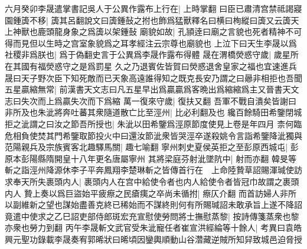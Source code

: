 六月癸卯李晟遣掌書記吳人于公異作露布上行在|{
	上時掌翻}
曰臣已肅清宫禁祗謁寢園鍾簴不移|{
	簴其呂翻說文曰簴鍾鼔之拊也飾爲猛獸釋名曰横曰栒縱曰簴又云簴天上神獸也鹿頭龍身象之爲簴以架鍾鼔}
廟貌如故|{
	孔頴逹曰廟之言貌也死者精神不可得而見但以生時之宫室象貌爲之耳孝經注云宗尊也廟貌也}
上泣下曰天生李晟以爲社稷非爲朕也|{
	爲于偽翻史言于公異爲李晟作露布得體}
晟在渭橋熒惑守歲|{
	歲星所在其國有福熒惑守之是爲罰星}
久之乃退賓佐皆賀曰熒惑退舍皇家之福也宜速進兵晟曰天子野次臣下知死敵而已天象高遠誰得知之既克長安乃謂之曰曏非相拒也吾聞五星贏縮無常|{
	前漢書天文志曰凡五星早出爲贏贏爲客晩出爲縮縮爲主又晉書天文志曰失次而上爲贏失次而下爲縮}
萬一復來守歲|{
	復扶又翻}
吾軍不戰自潰矣皆謝曰非所及也朱泚將奔吐蕃其衆隨道散亡比至涇州|{
	比必利翻及也}
纔百餘騎田希鑒閉城拒之泚謂之曰汝之節吾所授也|{
	朱泚以田希鑒爲涇原節度使見上卷是年四月}
柰何臨危相負使焚其門希鑒取節投火中曰還汝節泚衆皆哭涇卒遂殺姚令言詣希鑒降泚獨與范陽親兵及宗族賓客北趣驛馬關|{
	趣七喻翻}
寧州刺史夏侯英拒之至彭原西城屯|{
	彭原本彭陽縣隋開皇十八年更名唐屬寧州}
其將梁庭芬射泚墜阬中|{
	射而亦翻}
韓旻等斬之詣涇州降源休李子平奔鳳翔李楚琳斬之皆傳首行在　上命陸贄草詔賜渾瑊使訪求奉天所失裹頭内人|{
	裹頭内人在宫中給使令者也内人給使令者皆冠巾故謂之裹頭内人}
贄上奏以爲巨盜始平疲瘵之民瘡痍之卒尚未循拊|{
	瘵仄介翻}
而首訪婦人非所以副維新之望也謀始盡善克終已稀始而不謀終則何有所賜瑊詔未敢承旨上遂不降詔竟遣中使求之乙巳詔吏部侍郎斑宏充宣慰使勞問將士撫慰蒸黎|{
	按詩傳箋蒸衆也黎亦衆也勞力到翻}
丙午李晟斬文武官受朱泚寵任者崔宣洪經綸等十餘人|{
	考異曰袁皓興元聖功錄載李晟奏宥郭晞狀曰晞頃因鑾輿順動山谷濳藏逆賊所知舁致城邑迫脅授}


